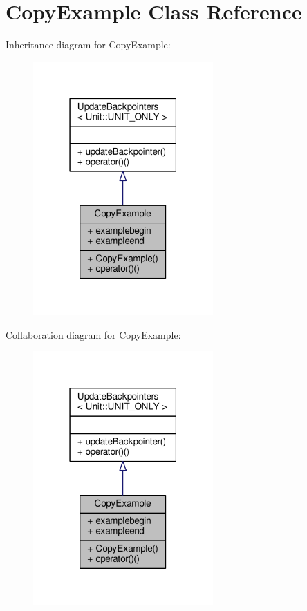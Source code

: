 \hypertarget{classCopyExample}{}\section{Copy\+Example Class Reference}
\label{classCopyExample}


Inheritance diagram for Copy\+Example\+:
\nopagebreak
\begin{figure}[H]
\begin{center}
\leavevmode
\includegraphics[width=195pt]{d2/d1f/classCopyExample__inherit__graph}
\end{center}
\end{figure}


Collaboration diagram for Copy\+Example\+:
\nopagebreak
\begin{figure}[H]
\begin{center}
\leavevmode
\includegraphics[width=195pt]{de/d93/classCopyExample__coll__graph}
\end{center}
\end{figure}
